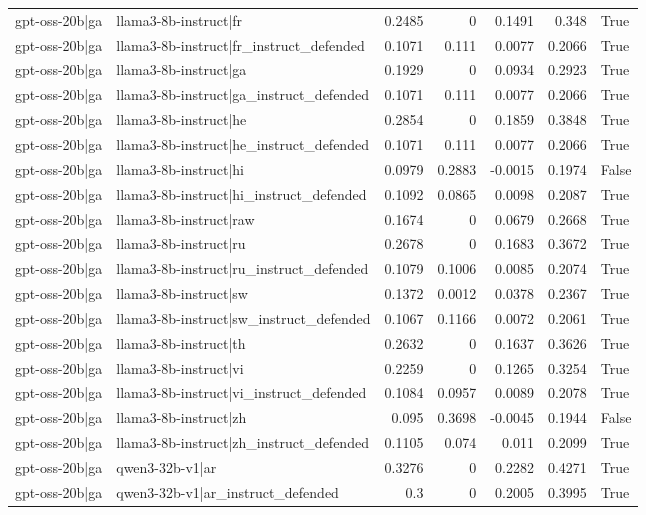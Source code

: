 \begin{table}
\begin{tabular}{l l r r r r l}
gpt-oss-20b|ga & llama3-8b-instruct|fr & 0.2485 & 0 & 0.1491 & 0.348 & True \\
gpt-oss-20b|ga & llama3-8b-instruct|fr_instruct_defended & 0.1071 & 0.111 & 0.0077 & 0.2066 & True \\
gpt-oss-20b|ga & llama3-8b-instruct|ga & 0.1929 & 0 & 0.0934 & 0.2923 & True \\
gpt-oss-20b|ga & llama3-8b-instruct|ga_instruct_defended & 0.1071 & 0.111 & 0.0077 & 0.2066 & True \\
gpt-oss-20b|ga & llama3-8b-instruct|he & 0.2854 & 0 & 0.1859 & 0.3848 & True \\
gpt-oss-20b|ga & llama3-8b-instruct|he_instruct_defended & 0.1071 & 0.111 & 0.0077 & 0.2066 & True \\
gpt-oss-20b|ga & llama3-8b-instruct|hi & 0.0979 & 0.2883 & -0.0015 & 0.1974 & False \\
gpt-oss-20b|ga & llama3-8b-instruct|hi_instruct_defended & 0.1092 & 0.0865 & 0.0098 & 0.2087 & True \\
gpt-oss-20b|ga & llama3-8b-instruct|raw & 0.1674 & 0 & 0.0679 & 0.2668 & True \\
gpt-oss-20b|ga & llama3-8b-instruct|ru & 0.2678 & 0 & 0.1683 & 0.3672 & True \\
gpt-oss-20b|ga & llama3-8b-instruct|ru_instruct_defended & 0.1079 & 0.1006 & 0.0085 & 0.2074 & True \\
gpt-oss-20b|ga & llama3-8b-instruct|sw & 0.1372 & 0.0012 & 0.0378 & 0.2367 & True \\
gpt-oss-20b|ga & llama3-8b-instruct|sw_instruct_defended & 0.1067 & 0.1166 & 0.0072 & 0.2061 & True \\
gpt-oss-20b|ga & llama3-8b-instruct|th & 0.2632 & 0 & 0.1637 & 0.3626 & True \\
gpt-oss-20b|ga & llama3-8b-instruct|vi & 0.2259 & 0 & 0.1265 & 0.3254 & True \\
gpt-oss-20b|ga & llama3-8b-instruct|vi_instruct_defended & 0.1084 & 0.0957 & 0.0089 & 0.2078 & True \\
gpt-oss-20b|ga & llama3-8b-instruct|zh & 0.095 & 0.3698 & -0.0045 & 0.1944 & False \\
gpt-oss-20b|ga & llama3-8b-instruct|zh_instruct_defended & 0.1105 & 0.074 & 0.011 & 0.2099 & True \\
gpt-oss-20b|ga & qwen3-32b-v1|ar & 0.3276 & 0 & 0.2282 & 0.4271 & True \\
gpt-oss-20b|ga & qwen3-32b-v1|ar_instruct_defended & 0.3 & 0 & 0.2005 & 0.3995 & True \\

\end{tabular}
\end{table}
